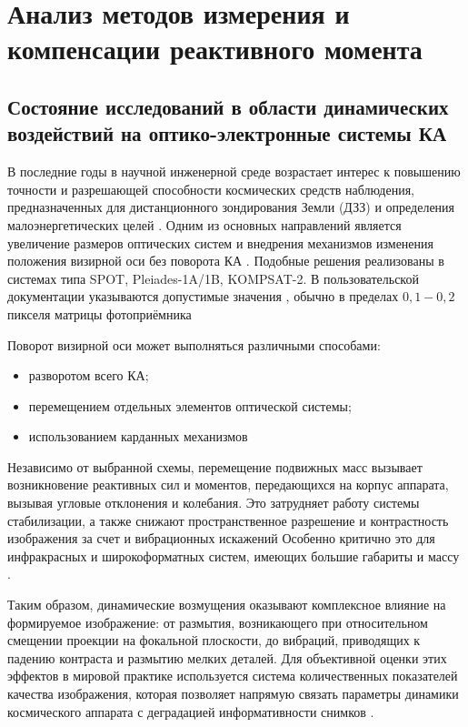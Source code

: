 \chapter{Анализ методов измерения и компенсации реактивного момента}\label{ch:ch1}
\section{Состояние исследований в области динамических воздействий на оптико-электронные системы КА}

В последние годы в научной инженерной среде возрастает интерес к повышению точности и разрешающей способности космических средств наблюдения, предназначенных для дистанционного зондирования Земли (ДЗЗ) и определения малоэнергетических целей \cite{haroon2020multisized, bouwmeester2023enabling, saunders2017building, cheng2024geometric, hamm2015earth}. Одним из основных направлений является увеличение размеров оптических систем и внедрения механизмов изменения положения визирной оси без поворота КА \cite{kandepi2024agile, franze2023attitude}. Подобные решения реализованы в системах типа SPOT, Pleiades-1A/1B, KOMPSAT-2. В пользовательской документации указываются допустимые значения \blur{}, обычно в пределах $0,1-0,2$ пикселя матрицы фотоприёмника \cite{SPOT2013, Pleiades2012,KOMPSAT2008} 

Поворот визирной оси может выполняться различными способами:
\begin{itemize}
	\item разворотом всего КА;
	\item перемещением отдельных элементов оптической системы;
	\item использованием карданных механизмов \cite{leskov2010kardan,negro2023inertial}
\end{itemize}

Независимо от выбранной схемы, перемещение подвижных масс вызывает возникновение реактивных сил и моментов, передающихся на корпус аппарата, вызывая угловые отклонения и колебания. Это затрудняет работу системы стабилизации, а также снижают пространственное разрешение и контрастность изображения за счет  и вибрационных искажений  \cite{lappas2002attitude, углова2019оценка, zhao2023effect} Особенно критично это для инфракрасных и широкоформатных систем, имеющих большие габариты и массу \cite{shorthill1990infrared, shivanandan1985far,pittelkau2012pointing, dennehy2021spacecraft, alvarez2018spacecraft}.

Таким образом, динамические возмущения оказывают комплексное влияние на формируемое изображение: от размытия, возникающего при относительном смещении проекции на фокальной плоскости, до вибраций, приводящих к падению контраста и размытию мелких деталей. Для объективной оценки этих эффектов в мировой практике используется система количественных показателей качества изображения, которая позволяет напрямую связать параметры динамики космического аппарата с деградацией информативности снимков \cite{gecha2021review, wahballah2018smear}.

